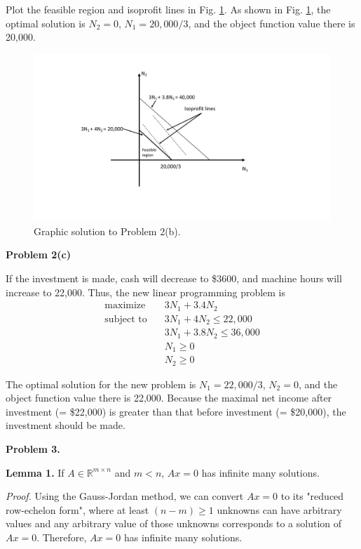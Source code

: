 \documentclass[12pt]{article}
\begin{document}
Plot the feasible region and isoprofit lines in Fig.  \ref{fig:2b}. As shown in Fig. \ref{fig:2b}, the optimal solution is $N_2 = 0$, $N_1 = 20,000/3$, and the object function value there is 20,000.

\begin{figure}[h]
    \centering
    \includegraphics[width=16cm,trim={3cm 5cm 6cm 2cm},clip]{HW.pdf}
    \caption{Graphic solution to Problem 2(b).}
    \label{fig:2b}
\end{figure}

\textbf{Problem 2(c)}

If the investment is made, cash will decrease to \$3600, and machine hours will increase to  22,000. Thus, the new linear programming problem is
\begin{align*}
    \text{maximize} \quad & 3N_1 + 3.4N_2  \\
    \text{subject to} \quad & 3N_1 + 4N_2 \le 22,000 \\
    & 3N_1 + 3.8N_2 \le 36,000 \\
    & N_1 \ge 0 \\
    & N_2 \ge 0
\end{align*}

The optimal solution for the new problem is $N_1=22,000/3$, $N_2=0$, and the object function value there is 22,000. Because the maximal net income after investment (= \$22,000) is greater than that before investment (= \$20,000), the investment should be made.

\vspace{\baselineskip}
\noindent
\textbf{Problem 3.}

\noindent
\textbf{Lemma 1.} If $A\in \mathbb{R}^{m\times n}$ and $m<n$, $Ax=0$ has infinite many solutions.

\noindent
\emph{Proof.} Using the Gauss-Jordan method, we can convert $Ax=0$ to its "reduced row-echelon form", where at least $(n-m)\ge 1$ unknowns can have arbitrary values and any arbitrary value of those unknowns corresponds to a solution of $Ax=0$. Therefore, $Ax=0$ has infinite many solutions.
\end{document}
